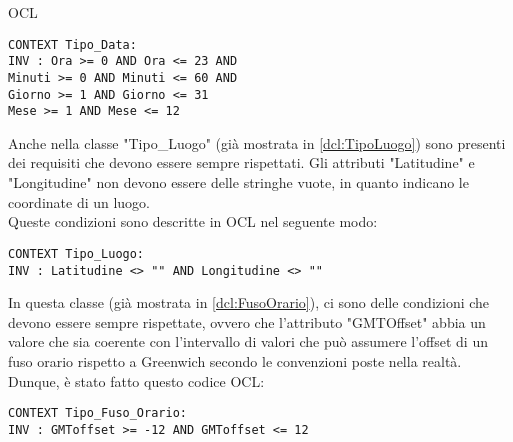 \begin{listaPersonale}{OCL}
    \begin{lstlisting}
CONTEXT Tipo_Data:
INV : Ora >= 0 AND Ora <= 23 AND
Minuti >= 0 AND Minuti <= 60 AND
Giorno >= 1 AND Giorno <= 31
Mese >= 1 AND Mese <= 12
    \end{lstlisting}




    \begin{center}
        
    \end{center}
    Anche nella classe "Tipo\_Luogo" (già mostrata in \ref{dcl:TipoLuogo}) sono presenti dei requisiti che devono essere sempre rispettati. Gli attributi "Latitudine" e "Longitudine" non devono essere delle stringhe vuote, in quanto indicano le coordinate di un luogo. \\
    Queste condizioni sono descritte in OCL nel seguente modo:

    \begin{lstlisting}
CONTEXT Tipo_Luogo:
INV : Latitudine <> "" AND Longitudine <> "" 
    \end{lstlisting}


    \begin{center}
        
    \end{center}
    In questa classe (già mostrata in \ref{dcl:FusoOrario}), ci sono delle condizioni che devono essere sempre rispettate, ovvero che l'attributo "GMTOffset" abbia un valore che sia coerente con l'intervallo di valori che può assumere l'offset di un fuso orario rispetto a Greenwich secondo le convenzioni poste nella realtà.\\
    Dunque, è stato fatto questo codice OCL:

    \begin{lstlisting}
CONTEXT Tipo_Fuso_Orario:
INV : GMToffset >= -12 AND GMToffset <= 12 
    \end{lstlisting}





\end{listaPersonale}
